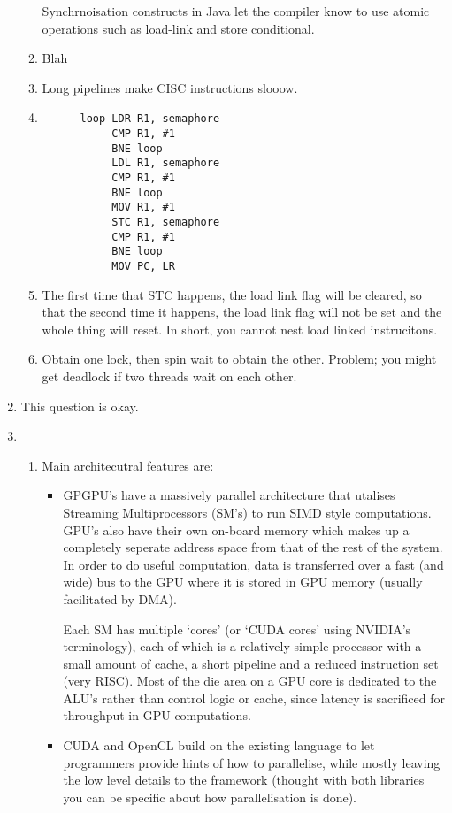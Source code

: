 \documentclass{report}
\begin{document}
\begin{enumerate}
\begin{enumerate}
    Synchrnoisation constructs in Java let the compiler know to use
    atomic operations such as load-link and store conditional.
  \item Blah
  \item Long pipelines make CISC instructions slooow.
  \item
    \begin{verbatim}
      loop LDR R1, semaphore
           CMP R1, #1
           BNE loop
           LDL R1, semaphore
           CMP R1, #1
           BNE loop
           MOV R1, #1
           STC R1, semaphore
           CMP R1, #1
           BNE loop
           MOV PC, LR
    \end{verbatim}
  \item The first time that STC happens, the load link flag will be
    cleared, so that the second time it happens, the load link flag
    will not be set and the whole thing will reset. In short, you
    cannot nest load linked instrucitons.
  \item Obtain one lock, then spin wait to obtain the other. Problem;
    you might get deadlock if two threads wait on each other.
  \end{enumerate}
\item This question is okay.
\item
  \begin{enumerate}
  \item Main architecutral features are:
    \begin{itemize}
    \item GPGPU's have a massively parallel architecture that utalises
      Streaming Multiprocessors (SM's) to run SIMD style
      computations. GPU's also have their own on-board memory which
      makes up a completely seperate address space from that of the
      rest of the system. In order to do useful computation, data is
      transferred over a fast (and wide) bus to the GPU where it is
      stored in GPU memory (usually facilitated by DMA).

      Each SM has multiple `cores' (or `CUDA cores' using NVIDIA's
      terminology), each of which is a relatively simple processor
      with a small amount of cache, a short pipeline and a reduced
      instruction set (very RISC). Most of the die area on a GPU core
      is dedicated to the ALU's rather than control logic or cache,
      since latency is sacrificed for throughput in GPU computations.
    \item CUDA and OpenCL build on the existing language to let
      programmers provide hints of how to parallelise, while mostly
      leaving the low level details to the framework (thought with
      both libraries you can be specific about how parallelisation is
      done).


\end{itemize}
\end{enumerate}
\end{enumerate}
\end{document}
